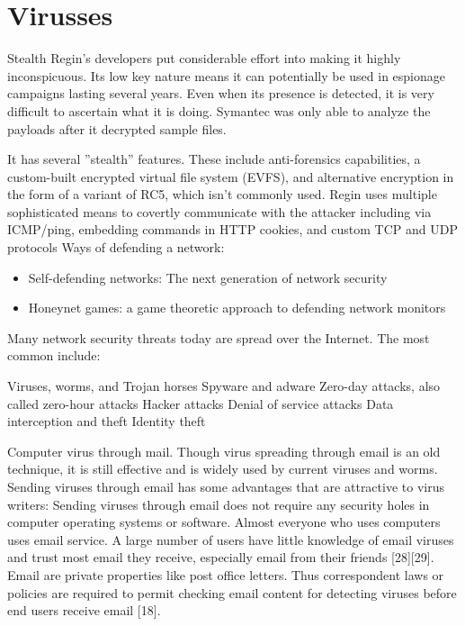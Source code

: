 \section{Virusses}

Stealth
Regin's developers put considerable effort into making it highly inconspicuous. Its low key nature means it can potentially be used in espionage campaigns lasting several years. Even when its presence is detected, it is very difficult to ascertain what it is doing. Symantec was only able to analyze the payloads after it decrypted sample files.

It has several ''stealth'' features. These include anti-forensics capabilities, a custom-built encrypted virtual file system (EVFS), and alternative encryption in the form of a variant of RC5, which isn't commonly used. Regin uses multiple sophisticated means to covertly communicate with the attacker including via ICMP/ping, embedding commands in HTTP cookies, and custom TCP and UDP protocols
Ways of defending a network:
\begin{itemize}
\item Self-defending networks: The next generation of network security
\item Honeynet games: a game theoretic approach to defending network monitors

\end{itemize}
Many network security threats today are spread over the Internet. The most common include:

Viruses, worms, and Trojan horses
Spyware and adware
Zero-day attacks, also called zero-hour attacks
Hacker attacks
Denial of service attacks
Data interception and theft
Identity theft


Computer virus through mail. 
Though virus spreading through email is an old technique, it is still effective and is widely used by
current viruses and worms. Sending viruses through email has some advantages that are attractive to
virus writers:
 Sending viruses through email does not require any security holes in computer operating systems
or software.
 Almost everyone who uses computers uses email service.
 A large number of users have little knowledge of email viruses and trust most email they receive,
especially email from their friends [28][29].
 Email are private properties like post office letters. Thus correspondent laws or policies are required
to permit checking email content for detecting viruses before end users receive email [18].

